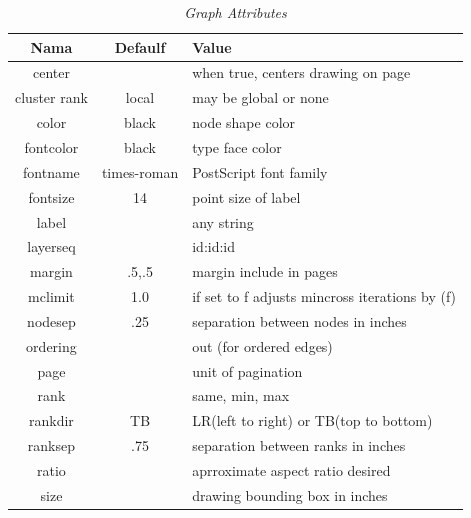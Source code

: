 \begin{enumerate}
\begin{enumerate}
\begin{table}[htbp]
\begin{center}
\begin{tabular}{|c|c|l|}
\hline
\end{tabular}
\end{center}
\end{table}

  \begin{table}[htbp]
\begin{center}
\caption{\textit{Graph Attributes}}
\begin{tabular}{|c|c|l|}
\hline
  Nama & Defaulf & Value \\
\hline
  center & & when true, centers drawing on page \\
  cluster rank & local & may be global or none \\
  color & black & node shape color \\
  fontcolor & black & type face color \\
  fontname & times-roman & PostScript font family \\
  fontsize & 14 & point size of label \\
  label & & any string \\
  layerseq & & id:id:id \\
  margin & .5,.5 & margin include in pages \\
  mclimit & 1.0 & if set to f adjusts mincross iterations by (f) \\
  nodesep & .25 & separation between nodes in inches \\
  ordering & & out (for ordered edges) \\
  page & & unit of pagination  \\
  rank & & same, min, max \\
  rankdir & TB & LR(left to right) or TB(top to bottom) \\
  ranksep & .75 & separation between ranks in inches \\
  ratio & & aprroximate aspect ratio desired \\
  size & & drawing bounding box in inches \\
\hline
\end{tabular}
\end{center}
\end{table}

\end{enumerate}




\end{enumerate}
